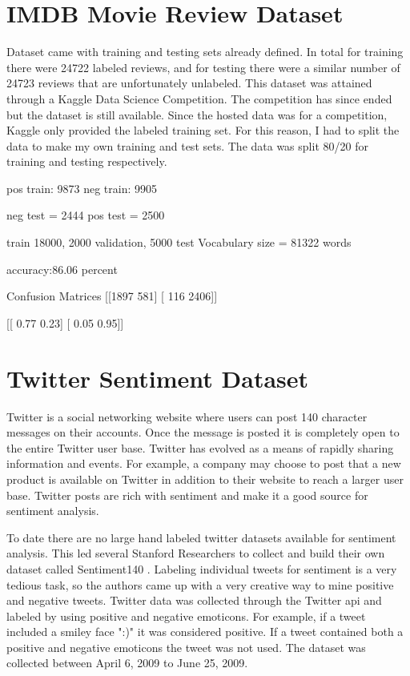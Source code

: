\documentclass[12pt]{article}
\begin{document}
\section{IMDB Movie Review Dataset}
Dataset came with training and testing sets already defined. In total for training there were 24722 labeled reviews, and for testing there were a similar number of 24723 reviews that are unfortunately unlabeled. This dataset was attained through a Kaggle Data Science Competition. The competition has since ended but the dataset is still available. Since the hosted data was for a competition, Kaggle only provided the labeled training set. For this reason, I had to split the data to make my own training and test sets. The data was split 80\slash20 for training and testing respectively.

pos train: 9873
neg train: 9905

neg test = 2444
pos test = 2500

train 18000, 2000 validation, 5000 test
Vocabulary size = 81322 words

accuracy:86.06 percent

Confusion Matrices
[[1897  581]
[ 116 2406]]

[[ 0.77  0.23]
[ 0.05  0.95]]





\section{Twitter Sentiment Dataset}

Twitter is a social networking website \cite{twitter} where users can post 140 character messages on their accounts. Once the message is posted it is completely open to the entire Twitter user base. Twitter has evolved as a means of rapidly sharing information and events. For example, a company may choose to post that a new product is available on Twitter in addition to their website to reach a larger user base. Twitter posts are rich with sentiment and make it a good source for sentiment analysis.

To date there are no large hand labeled twitter datasets available for sentiment analysis. This led several Stanford Researchers \cite{Go_Bhayani_Huang_2009} to collect and build their own dataset called Sentiment140 \cite{sentiment140}. Labeling individual tweets for sentiment is a very tedious task, so the authors came up with a very creative way to mine positive and negative tweets. Twitter data was collected through the Twitter \ac{api} and labeled by using positive and negative emoticons. For example, if a tweet included a smiley face ":)" it was considered positive. If a tweet contained both a positive and negative emoticons the tweet was not used. The dataset was collected between April 6, 2009 to June 25, 2009.
\end{document}

